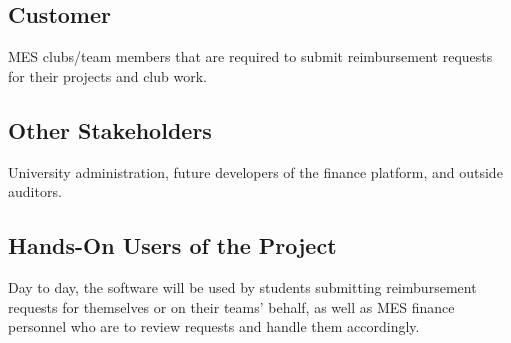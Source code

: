 \documentclass[12pt]{article}
\begin{document}
\subsection{Customer}
MES clubs/team members that are required to submit reimbursement requests for their projects and club work.

\subsection{Other Stakeholders}
University administration, future developers of the finance platform, and outside auditors.

\subsection{Hands-On Users of the Project}
Day to day, the software will be used by students submitting reimbursement requests for themselves or on their teams' behalf, as well as MES finance personnel who are to review requests and handle them accordingly.
\end{document}
